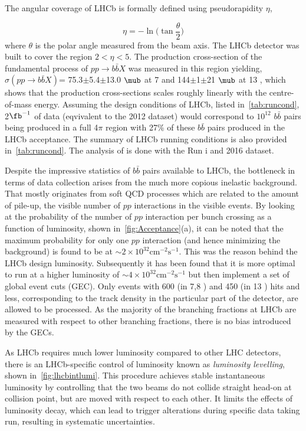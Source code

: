 The angular coverage of \Gls{LHCb} is formally defined using pseudorapidity $\eta$, 

\begin{equation}
	\eta = -\ln \Big(\tan\frac{\theta}{2}\Big)
\end{equation}	
where $\theta$ is the polar angle measured from the beam axis. The \Gls{LHCb} detector was built to cover the region $2<\eta<5$. The production cross-section of the fundamental process of $pp\rightarrow b\bar{b}X$ was measured in this region yielding, $\sigma (pp\rightarrow b\bar{b}X)$= 75.3$\pm$5.4$\pm$13.0 $\mub$ at 7 \tev \cite{LHCb-PAPER-2010-002} and 144$\pm$1$\pm$21 $\mub$ at 13 \tev \cite{LHCb-PAPER-2016-031}, which shows that the production cross-sections scales roughly linearly with the centre-of-mass energy. Assuming the design conditions of \gls{LHCb}, listed in~\autoref{tab:runcond}, 2$\fb^{-1}$ of data (eqvivalent to the 2012 dataset) would correspond to $10^{12}$ $b\bar{b}$ pairs being produced in a full 4$\pi$ region with 27\% of these $b\bar{b}$ pairs produced in the \gls{LHCb} acceptance. The summary of \gls{LHCb} running conditions is also provided in~\autoref{tab:runcond}. The analysis of \Bmumumu is done with the Run \Rn{1} and 2016 dataset. 

Despite the impressive statistics of $b\bar{b}$ pairs available to \Gls{LHCb}, the bottleneck in terms of data collection arises from the much more copious inelastic background. That mostly originates from soft \gls{QCD} processes which are related to the amount of pile-up, the visible number of $pp$ interactions in the visible events. By looking at the probability of the number of $pp$ interaction per bunch crossing as a function of luminosity, shown in~\autoref{fig:Acceptance}(a), it can be noted that the maximum probability for only one $pp$ interaction (and hence minimizing the background) is found to be at $\sim 2 \times10^{32} \mathrm{cm^{-2} s^{-1}}$.  This was the reason behind the \gls{LHCb} design luminosity. Subsequently it has been found that it is more optimal to run at a higher luminosity of $\sim 4 \times10^{32} \mathrm{cm^{-2} s^{-1}}$ but then implement a set of global event cuts (GEC). Only events with 600 (in 7,8 \tev) and 450 (in 13 \tev) hits and less, corresponding to the track density in the particular part of the detector, are allowed to be processed.
As the majority of the branching fractions at \gls{LHCb} are measured with respect to other branching fractions, there is no bias introduced by the GECs. 

As \Gls{LHCb} requires much lower luminosity compared to other \gls{LHC} detectors, there is an LHCb-specific control of luminosity known as \textit{luminosity levelling}, shown in~\autoref{fig:lhcbintlumi}. This procedure achieves stable instantaneous luminosity by controlling that the two beams do not collide straight head-on at collision point, but are moved with respect to each other. It limits the effects of luminosity decay, which can lead to trigger alterations during specific data taking run, resulting in systematic uncertainties.



